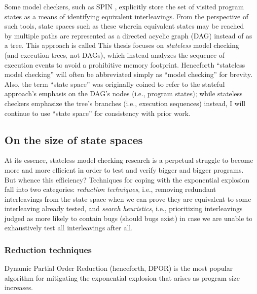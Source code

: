 Some model checkers,
such as SPIN \cite{spin},
explicitly store the set of visited program states as a means of identifying equivalent interleavings.
From the perspective of such tools, state spaces such as these wherein equivalent states may be reached by multiple paths
are represented as a directed acyclic graph (DAG) instead of as a tree.
This approach is called  %
This thesis focuses on {\em stateless} model checking (and execution trees, not DAGs),
which instead analyzes the sequence of execution events to avoid a prohibitive memory footprint.
Henceforth ``stateless model checking'' will often be abbreviated simply as ``model checking'' for brevity.
Also, the term ``state space'' was originally coined to refer to the stateful approach's emphasis on the DAG's nodes
(i.e., program states);
while stateless checkers emphasize the tree's branches (i.e., execution sequences) instead,
I will continue to use ``state space'' for consistency with prior work.

\subsection{On the size of state spaces}

At its essence, stateless model checking research is a perpetual struggle to become more and more efficient in order to test and verify bigger and bigger programs.
But whence this efficiency?
Techniques for coping with the exponential explosion fall into two categories:
{\em reduction techniques},
i.e.,
removing redundant interleavings from the state space when we can prove they are equivalent to some interleaving already tested,
and
{\em search heuristics},
i.e.,
prioritizing interleavings judged as more likely to contain bugs (should bugs exist)
in case we are unable to exhaustively test all interleavings after all.

\subsubsection{Reduction techniques}

Dynamic Partial Order Reduction \cite{dpor} (henceforth, DPOR) is the most popular algorithm for mitigating the exponential explosion that arises as program size increases.

